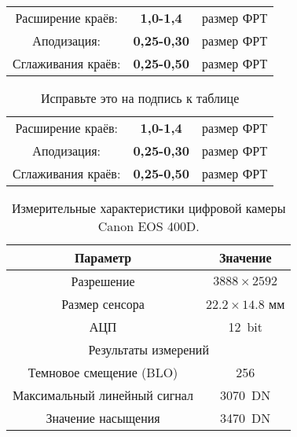 \documentclass[a4paper,12pt]{report} %
\begin{document}
  \begin{center}
    \begin{tabular}{ccc}
      Расширение краёв: & \textbf{1,0-1,4} & размер ФРТ \\
      Аподизация: & \textbf{0,25-0,30}& размер ФРТ \\
      Сглаживания краёв: & \textbf{0,25-0,50}& размер ФРТ \\
    \end{tabular}
    \begin{table}[H]
      \caption{Исправьте это на подпись к таблице}
      \label{tabular:timesandtenses}
      \begin{center}
        \begin{tabular}{ccc}
        Расширение краёв: & \textbf{1,0-1,4} & размер ФРТ \\
        Аподизация: & \textbf{0,25-0,30}& размер ФРТ \\
        Сглаживания краёв: & \textbf{0,25-0,50}& размер ФРТ \\
        \end{tabular}
      \end{center}
    \end{table}
  \end{center}
  \begin{table}[H]
    \caption{\label{tab:canonsummary}Измерительные характеристики цифровой камеры Canon EOS 400D.}
    \begin{center}
      \begin{tabular}{|c|c|}
        \hline
        Параметр & Значение \\
        \hline
        Разрешение & $3888 \times 2592$ \\
        Размер сенсора & $22.2 \times 14.8$ мм \\
        АЦП & 12~bit\\
        \hline
        \multicolumn{2}{|c|}{Результаты измерений} \\
        \hline
        Темновое смещение (BLO) & 256 \\
        Максимальный линейный сигнал & 3070~DN \\
        Значение насыщения & 3470~DN \\
        \hline
      \end{tabular}
    \end{center}
  \end{table}
\end{document}

